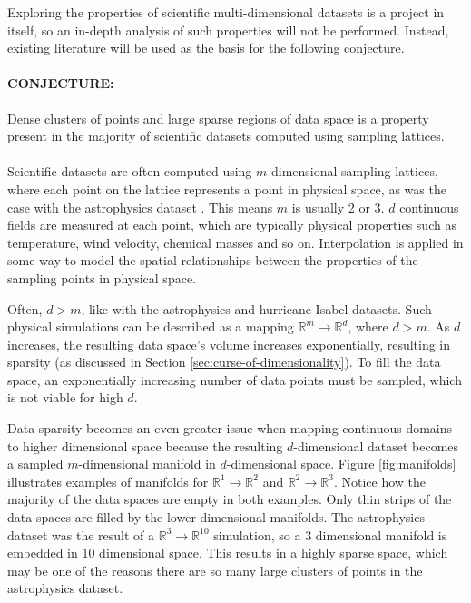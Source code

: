 Exploring the properties of scientific multi-dimensional datasets is a project in itself, so an in-depth analysis of such properties will not be performed. Instead, existing literature will be used as the basis for the following conjecture.

\paragraph{\textbf{CONJECTURE:}} Dense clusters of points and large sparse regions of data space is a property present in the majority of scientific datasets computed using sampling lattices. 
\paragraph{}

Scientific datasets are often computed using $m$-dimensional sampling lattices, where each point on the lattice represents a point in physical space, as was the case with the astrophysics dataset \cite{astrophysics-dataset}. This means $m$ is usually 2 or 3. $d$ continuous fields are measured at each point, which are typically physical properties such as temperature, wind velocity, chemical masses and so on. Interpolation is applied in some way to model the spatial relationships between the properties of the sampling points in physical space.

Often, $d > m$, like with the astrophysics and hurricane Isabel datasets. Such physical simulations can be described as a mapping $\mathbb{R}^m \rightarrow \mathbb{R}^d$, where $d > m$. As $d$ increases, the resulting data space's volume increases exponentially, resulting in sparsity (as discussed in Section \ref{sec:curse-of-dimensionality}). To fill the data space, an exponentially increasing number of data points must be sampled, which is not viable for high $d$.

Data sparsity becomes an even greater issue when mapping continuous domains to higher dimensional space because the resulting $d$-dimensional dataset becomes a sampled $m$-dimensional manifold in $d$-dimensional space. Figure \ref{fig:manifolds} illustrates examples of manifolds for $\mathbb{R}^1 \rightarrow \mathbb{R}^2$ and $\mathbb{R}^2 \rightarrow \mathbb{R}^3$. Notice how the majority of the data spaces are empty in both examples. Only thin strips of the data spaces are filled by the lower-dimensional manifolds. The astrophysics dataset was the result of a $\mathbb{R}^3 \rightarrow \mathbb{R}^{10}$ simulation, so a 3 dimensional manifold is embedded in 10 dimensional space. This results in a highly sparse space, which may be one of the reasons there are so many large clusters of points in the astrophysics dataset.

